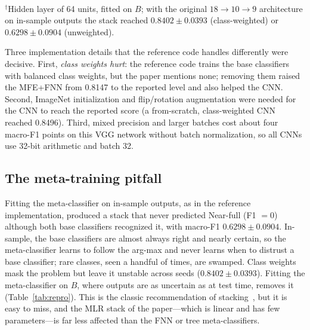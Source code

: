\documentclass[conference]{IEEEtran}
\begin{document}
\begin{table}[t]
\centering
\caption{Reproduction at $N=162{,}946$: test macro- and micro-F1, ours vs.\ Kang and Kang~\cite{kang2021stacking} (Table~7,
10 replications). Stacking-DT and Stacking-MLR use the original protocol (meta-classifier fitted on in-sample outputs on $A$).}
\label{tab:repro}
\setlength{\tabcolsep}{3pt}
\\[2pt]
\footnotesize{$^\dagger$Hidden layer of 64 units, fitted on $B$; with the original $18\!\to\!10\!\to\!9$ architecture
on in-sample outputs the stack reached $0.8402 \pm 0.0393$ (class-weighted) or $0.6298 \pm 0.0904$ (unweighted).}
\end{table}

Three implementation details that the reference code handles differently were decisive. First, \emph{class weights hurt}:
the reference code trains the base classifiers with balanced class weights, but the paper mentions none; removing them
raised the MFE+FNN from 0.8147 to the reported level and also helped the CNN. Second, ImageNet initialization and
flip/rotation augmentation were needed for the CNN to reach the reported score (a from-scratch, class-weighted CNN
reached 0.8496). Third, mixed precision and larger batches cost about four macro-F1 points on this VGG network without
batch normalization, so all CNNs use 32-bit arithmetic and batch 32.

\subsection{The meta-training pitfall}
\label{sec:pitfall}
Fitting the meta-classifier on in-sample outputs, as in the reference implementation, produced a stack that never
predicted Near-full (F1 $=0$) although both base classifiers recognized it, with macro-F1 $0.6298 \pm 0.0904$. In-sample,
the base classifiers are almost always right and nearly certain, so the meta-classifier learns to follow the
arg-max and never learns when to distrust a base classifier; rare classes, seen a handful of times, are swamped. Class
weights mask the problem but leave it unstable across seeds ($0.8402 \pm 0.0393$). Fitting the meta-classifier on $B$,
where outputs are as uncertain as at test time, removes it (Table~\ref{tab:repro}). This is the classic recommendation of
stacking~\cite{wolpert1992stacked,ting1999issues}, but it is easy to miss, and the MLR stack of the paper---which is
linear and has few parameters---is far less affected than the FNN or tree meta-classifiers.
\end{document}

